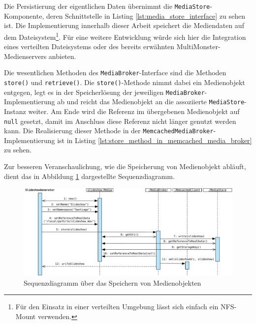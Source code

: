   

  Die Persistierung der eigentlichen Daten übernimmt die \verb!MediaStore!-Komponente, deren Schnittstelle in Listing \ref{lst:media_store_interface} zu sehen ist. Die Implementierung innerhalb dieser Arbeit speichert die Mediendaten auf dem Dateisystem\footnote{Für den Einsatz in einer verteilten Umgebung lässt sich einfach ein NFS-Mount verwenden.}. Für eine weitere Entwicklung würde sich hier die Integration eines verteilten Dateisystems oder des bereits erwähnten MultiMonster-Medienservers anbieten.

  

  Die wesentlichen Methoden des \verb!MediaBroker!-Interface sind die Methoden \verb!store()! und \verb!retrieve()!. Die \verb!store()!-Methode nimmt dabei ein Medienobjekt entgegen, legt es in der Speicherlösung der jeweiligen \verb!MediaBroker!-Implementierung ab und reicht das Medienobjekt an die assoziierte \verb!MediaStore!-Instanz weiter. Am Ende wird die Referenz im übergebenen Medienobjekt auf \verb!null! gesetzt, damit im Anschluss diese Referenz nicht länger genutzt werden kann. Die Realisierung dieser Methode in der \verb!MemcachedMediaBroker!-Implementierung ist in Listing \ref{lst:store_method_in_memcached_media_broker} zu sehen.

  
  
  Zur besseren Veranschaulichung, wie die Speicherung von Medienobjekt abläuft, dient das in Abbildung \ref{fig:speichern_von_medienobjekten} dargestellte Sequenzdiagramm.

  \begin{figure}[!ht]
    \centering
      \includegraphics[width=\textwidth]{images/Handling_of_Media_Objects_write.pdf}
    \caption{Sequenzdiagramm über das Speichern von Medienobjekten}
    \label{fig:speichern_von_medienobjekten}
  \end{figure}
  
